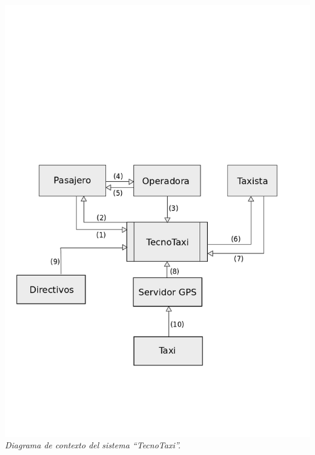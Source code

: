 \vspace{\baselineskip}
        \begin{center}
		    \includegraphics[scale=0.50]{contexto.png}
		    \\
		    \vspace{1pt}
		    \footnotesize\textit{Diagrama de contexto del sistema “TecnoTaxi”.}
	    \end{center}
    \vspace{\baselineskip}
\par 

